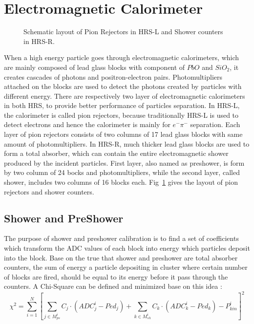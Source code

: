 \section{Electromagnetic Calorimeter}

\begin{figure}[htb]
\centerline{}
\caption[Schematic layout of pion rejectors in HRS-L and shower counters in HRS-R]
{\footnotesize{Schematic layout of Pion Rejectors in HRS-L and Shower counters in HRS-R.}
\label{shower}}
\end{figure}

 When a high energy particle goes through electromagnetic calorimeters, which are mainly composed of lead glass blocks with component of $PbO$ and $SiO_{2}$, it creates cascades of photons and positron-electron pairs. Photomultipliers attached on the blocks are used to detect the photons created by particles with different energy. There are respectively two layer of electromagnetic calorimeters in both HRS, to provide better performance of particles separation. In HRS-L, the calorimeter is called pion rejectors, because traditionally HRS-L is used to detect electrons and hence the calorimeter is mainly for $e^- \pi^-$ separation. Each layer of pion rejectors consists of two columns of 17 lead glass blocks with same amount of photomultipliers. In HRS-R, much thicker lead glass blocks are used to form a total absorber, which can contain the entire electromagnetic shower produced by the incident particles. First layer, also named as preshower, is form by two column of 24 bocks and photomultipliers, while the second layer, called shower, includes two columns of 16 blocks each. Fig~\ref{shower} gives the layout of pion rejectors and shower counters.


\subsection{Shower and PreShower}
 The purpose of shower and preshower calibration is to find a set of coefficients which transform the ADC values of each block into energy which particles deposit into the block. Base on the true that shower and preshower are total absorber counters, the sum of energy a particle depositing in cluster where certain number of blocks are fired, should be equal to its energy before it pass through the counters. A Chi-Square can be defined and minimized base on this idea \cite{shower_ak}:
\begin{equation}
 \chi^{2} = \sum_{i=1}^{N}[\sum_{j\in M_{ps}^{i}}C_{j}\cdot (ADC_{j}^{i}-Ped_{j})+\sum_{k\in M_{sh}^{i}}C_{k}\cdot (ADC_{k}^{i}-Ped_{k})-P_{kin}^{i}]^{2}
\end{equation}

